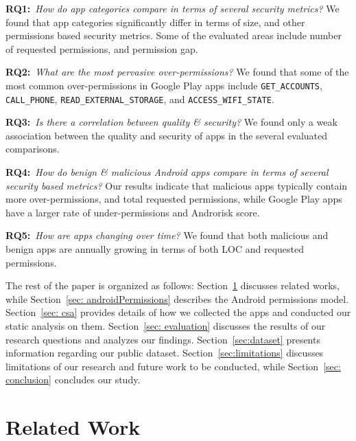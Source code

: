 \documentclass{llncs}
\newcommand{\dan}[1]{\textcolor{blue}{{\it [Dan says: #1]}}}
\begin{document}

\noindent
\textbf{RQ1:}~\emph{How do app categories compare in terms of several security metrics?} We found that app categories significantly differ in terms of size, and other permissions based security metrics. Some of the evaluated areas include number of requested permissions, and permission gap.


\noindent
\textbf{RQ2:}~\emph{What are the most pervasive over-permissions?} We found that some of the most common over-permissions in Google Play apps include \texttt{GET\_ACCOUNTS}, \texttt{CALL\_PHONE}, \texttt{READ\_EXTERNAL\_STORAGE}, and \texttt{ACCESS\_WIFI\_STATE}.

\noindent
\textbf{RQ3:}~\emph{Is there a correlation between quality \& security?} We found only a weak association between the quality and security of apps in the several evaluated comparisons.

\noindent
\textbf{RQ4:}~\emph{How do benign \& malicious Android apps compare in terms of several security based metrics?} Our results indicate that malicious apps typically contain more over-permissions, and total requested permissions, while Google Play apps have a larger rate of under-permissions and Androrisk score.

\noindent
\textbf{RQ5:}~\emph{How are apps changing over time?} We found that both malicious and benign apps are annually growing in terms of both LOC and requested permissions.

The rest of the paper is organized as follows: Section~\ref{sec: relatedwork} discusses related works, while Section~\ref{sec: androidPermissions} describes the Android permissions model. Section~\ref{sec: csa} provides details of how we collected the apps and conducted our static analysis on them. Section~\ref{sec: evaluation} discusses the results of our research questions and analyzes our findings. Section~\ref{sec:dataset} presents information regarding our public dataset. Section~\ref{sec:limitations} discusses limitations of our research and future work to be conducted, while Section~\ref{sec: conclusion} concludes our study.

\section{Related Work}
\label{sec: relatedwork}
\end{document}
